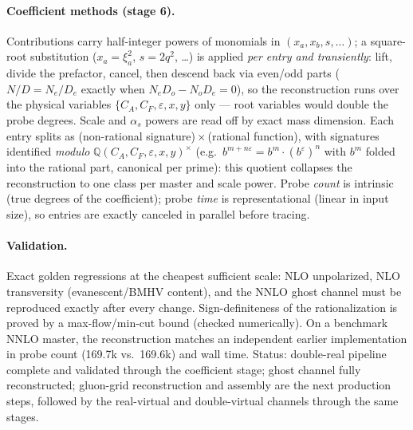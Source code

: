 \documentclass[10pt]{article}
\newcommand{\eps}{\varepsilon}
\newcommand{\CA}{C_A}
\newcommand{\CF}{C_F}
\newcommand{\as}{\alpha_s}
\begin{document}
\paragraph{Coefficient methods (stage 6).}  Contributions carry
half-integer powers of monomials in $(x_a,x_b,s,\dots)$; a square-root
substitution ($x_a=\xi_a^2$, $s=2q^2$, \dots) is applied
\emph{per entry and transiently}: lift, divide the prefactor, cancel,
then descend back via even/odd parts ($N/D = N_e/D_e$ exactly when
$N_eD_o - N_oD_e = 0$), so the reconstruction runs over the physical
variables $\{\CA,\CF,\eps,x,y\}$ only --- root variables would double
the probe degrees.  Scale and $\as$ powers are read off by exact mass
dimension.  Each entry splits as (non-rational
signature)\,$\times$\,(rational function), with signatures identified
\emph{modulo} $\mathbb{Q}(\CA,\CF,\eps,x,y)^\times$
(e.g.\ $b^{m+n\eps} = b^m \cdot (b^\eps)^n$ with $b^m$ folded into the
rational part, canonical per prime): this quotient collapses the
reconstruction to one class per master and scale power.  Probe
\emph{count} is intrinsic (true degrees of the coefficient); probe
\emph{time} is representational (linear in input size), so entries are
exactly canceled in parallel before tracing.

\paragraph{Validation.}  Exact golden regressions at the cheapest
sufficient scale: NLO unpolarized, NLO transversity (evanescent/BMHV
content), and the NNLO ghost channel must be reproduced exactly after
every change.  Sign-definiteness of the rationalization is proved by a
max-flow/min-cut bound (checked numerically).  On a benchmark NNLO
master, the reconstruction matches an independent earlier
implementation in probe count (169.7k vs.\ 169.6k) and wall time.
Status: double-real pipeline complete and validated through the
coefficient stage; ghost channel fully reconstructed; gluon-grid
reconstruction and assembly are the next production steps, followed by
the real-virtual and double-virtual channels through the same stages.
\end{document}
